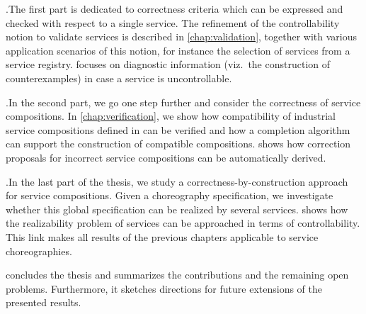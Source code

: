 \begin{niceitemize}
\item {}.\quad The first part is dedicated to correctness criteria which can be expressed and checked with respect to a single service. The refinement of the controllability notion to validate  services is described in \autoref{chap:validation}, together with various application scenarios of this notion, for instance the selection of services from a service registry.  focuses on diagnostic information (viz.\ the construction of counterexamples) in case a service is uncontrollable.

\item {}.\quad In the second part, we go one step further and consider the correctness of service compositions. In \autoref{chap:verification}, we show how compatibility of industrial service compositions defined in \bpelchor{} can be verified and how a completion algorithm can support the construction of compatible compositions.  shows how correction proposals for incorrect service compositions can be automatically derived.

\item {}.\quad In the last part of the thesis, we study a correctness-by-construction approach for service compositions. Given a choreography specification, we investigate whether this global specification can be realized by several services.  shows how the realizability problem of services can be approached in terms of controllability. This link makes all results of the previous chapters applicable to service choreographies.
\end{niceitemize}

\medskip

 concludes the thesis and summarizes the contributions and the remaining open problems. Furthermore, it sketches directions for future extensions of the presented results.
